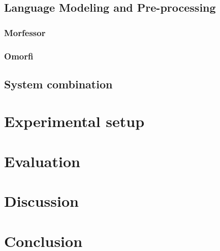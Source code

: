 \documentclass[b5paper]{article}
\begin{document}
\subsection{Language Modeling and Pre-processing}

\subsubsection{Morfessor}

\subsubsection{Omorfi}

\subsection{System combination}


\section{Experimental setup}
\label{sec:experimental-setup}

\section{Evaluation}
\label{sec:evaluation}

\section{Discussion}
\label{sec:discussion}

\section{Conclusion}
\label{sec:conclusion}



\end{document}

